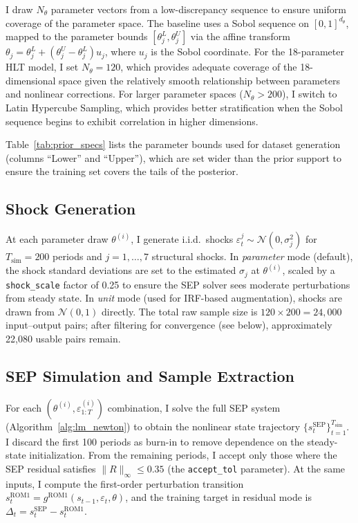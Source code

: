 \documentclass[12pt]{article}
\theoremstyle{plain}
\theoremstyle{definition}
\theoremstyle{remark}
\begin{document}
I draw $N_\theta$ parameter vectors from a low-discrepancy sequence to ensure uniform coverage of the parameter space. The baseline uses a Sobol sequence on $[0,1]^{d_\theta}$, mapped to the parameter bounds $[\theta_j^L, \theta_j^U]$ via the affine transform $\theta_j = \theta_j^L + (\theta_j^U - \theta_j^L) u_j$, where $u_j$ is the Sobol coordinate. For the 18-parameter HLT model, I set $N_\theta = 120$, which provides adequate coverage of the 18-dimensional space given the relatively smooth relationship between parameters and nonlinear corrections. For larger parameter spaces ($N_\theta > 200$), I switch to Latin Hypercube Sampling, which provides better stratification when the Sobol sequence begins to exhibit correlation in higher dimensions.

Table~\ref{tab:prior_specs} lists the parameter bounds used for dataset generation (columns ``Lower'' and ``Upper''), which are set wider than the prior support to ensure the training set covers the tails of the posterior.


\subsection{Shock Generation}

At each parameter draw $\theta^{(i)}$, I generate i.i.d.\ shocks $\varepsilon_t^j \sim \mathcal{N}(0, \sigma_j^2)$ for $T_{\text{sim}} = 200$ periods and $j = 1, \ldots, 7$ structural shocks. In \textit{parameter} mode (default), the shock standard deviations are set to the estimated $\sigma_j$ at $\theta^{(i)}$, scaled by a \texttt{shock\_scale} factor of 0.25 to ensure the SEP solver sees moderate perturbations from steady state. In \textit{unit} mode (used for IRF-based augmentation), shocks are drawn from $\mathcal{N}(0, 1)$ directly. The total raw sample size is $120 \times 200 = 24{,}000$ input--output pairs; after filtering for convergence (see below), approximately 22,080 usable pairs remain.


\subsection{SEP Simulation and Sample Extraction}

For each $(\theta^{(i)}, \varepsilon_{1:T}^{(i)})$ combination, I solve the full SEP system (Algorithm~\ref{alg:lm_newton}) to obtain the nonlinear state trajectory $\{s_t^{\text{SEP}}\}_{t=1}^{T_{\text{sim}}}$. I discard the first 100 periods as burn-in to remove dependence on the steady-state initialization. From the remaining periods, I accept only those where the SEP residual satisfies $\|R\|_\infty \leq 0.35$ (the \texttt{accept\_tol} parameter). At the same inputs, I compute the first-order perturbation transition $s_t^{\text{ROM1}} = g^{\text{ROM1}}(s_{t-1}, \varepsilon_t, \theta)$, and the training target in residual mode is $\Delta_t = s_t^{\text{SEP}} - s_t^{\text{ROM1}}$.
\end{document}
